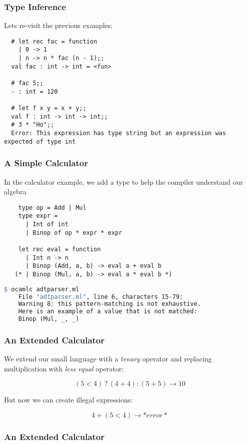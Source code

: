 \documentclass[xcolor=svgnames]{beamer}
\renewcommand{\_}{\mathunderscore}
\begin{document}
\begin{frame}[fragile]
  \frametitle{Type Inference}
  Lets re-visit the previous examples:
  \begin{lstlisting}
  # let rec fac = function
    | 0 -> 1
    | n -> n * fac (n - 1);;
  val fac : int -> int = <fun>

  # fac 5;;
  - : int = 120

  # let f x y = x + y;;
  val f : int -> int -> int;;
  # 3 * "Ho";;
  Error: This expression has type string but an expression was expected of type int
  \end{lstlisting}

\end{frame}

\begin{frame}[fragile]
  \frametitle{A Simple Calculator}
  In the calculator example, we add a type to help the compiler
  understand our algebra
  \begin{lstlisting}
    type op = Add | Mul
    type expr =
      | Int of int
      | Binop of op * expr * expr

    let rec eval = function
      | Int n -> n
      | Binop (Add, a, b) -> eval a + eval b
   (* | Binop (Mul, a, b) -> eval a * eval b *)

  \end{lstlisting}
  \pause
  \begin{lstlisting}[language=make,frame=none,numbers=none]
    $ ocamlc adtparser.ml
    File "adtparser.ml", line 6, characters 15-79:
    Warning 8: this pattern-matching is not exhaustive.
    Here is an example of a value that is not matched:
    Binop (Mul, _, _)
  \end{lstlisting}

\end{frame}

\begin{frame}[fragile]
  \frametitle{An Extended Calculator}
  We extend our small language with a \textit{tenary} operator and
  replacing multiplication with  \textit{less equal} operator:

  \[(5 < 4) \mathbin? (4 + 4) : (5 + 5) \to 10\]

  \pause
  But now we can create illegal expressions:

  \[4 + (5 < 4) \to *error*\]

\end{frame}

\begin{frame}[fragile]
  \frametitle{An Extended Calculator}
  
\end{frame}
\end{document}
